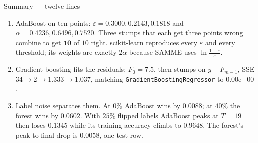 \documentclass[aspectratio=169]{beamer}
\begin{document}
\begin{frame}[shrink=22]{Summary --- twelve lines}
\begin{enumerate}
    \item AdaBoost on ten points: $\varepsilon = 0.3000, 0.2143, 0.1818$ and
      $\alpha = 0.4236, 0.6496, 0.7520$. Three stumps that each get three
      points wrong combine to get $\mathbf{10}$ of $10$ right. scikit-learn
      reproduces every $\varepsilon$ and every threshold; its weights are
      exactly $2\alpha$ because SAMME uses
      $\ln\frac{1-\varepsilon}{\varepsilon}$.
    \item Gradient boosting fits the residuals: $F_0 = 7.5$, then stumps on
      $y - F_{m-1}$, SSE $34 \to 2 \to 1.333 \to \mathbf{1.037}$, matching
      \texttt{GradientBoostingRegressor} to $0.00\mathrm{e}{+00}$.
    \item Label noise separates them. At $0\%$ AdaBoost wins by $0.0088$; at
      $40\%$ the forest wins by $\mathbf{0.0602}$. With $25\%$ flipped labels
      AdaBoost peaks at $T = 19$ then loses $0.1345$ while its training
      accuracy climbs to $0.9648$. The forest's peak-to-final drop is
      $0.0058$, one test row.
  \end{enumerate}
\end{frame}
\end{document}
